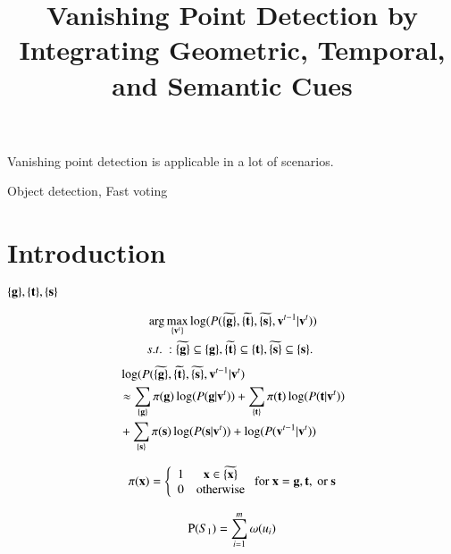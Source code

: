\documentclass[paper]{ieice}
\title{Vanishing Point Detection by Integrating Geometric, Temporal, and Semantic Cues}
\begin{document}
\maketitle
\begin{summary}
Vanishing point detection is applicable in a lot of scenarios.
\end{summary}
\begin{keywords}
Object detection, Fast voting
\end{keywords}

\section{Introduction}


$\{\bf g\},\{\bf t\},\{\bf s\}$

\[
\begin{aligned}
&\arg\max  \limits_{\{{\bf v}^t\}} \log(P(\widetilde{\{\bf g\}},\widetilde{\{\bf t\}},\widetilde{\{\bf s\}},{\bf v}^{t-1}|{\bf v}^t) )\\
&s.t.\ :\widetilde{\{\bf g\}} \subseteq \{\bf g\},\widetilde{\{\bf t\}} \subseteq \{\bf t\}, \widetilde{\{\bf s\}} \subseteq \{\bf s\}.\\
\end{aligned}
\]
\[
\begin{aligned}
&\log(P(\widetilde{\{\bf g\}},\widetilde{\{\bf t\}},\widetilde{\{\bf s\}},{\bf v}^{t-1}|{\bf v}^t)\\ 
&\approx \sum_{\{\bf g\}}{\pi({\bf g})\log(P({\bf g}|{\bf v}^t))}+\sum_{\{\bf t\}}{\pi({\bf t})\log(P({\bf t}|{\bf v}^t))}\\&+\sum_{\{\bf s\}}{\pi({\bf s})\log(P({\bf s}|{\bf v}^t))}+\log(P({\bf v}^{t-1}|{\bf v}^t))\\
\end{aligned}
\]




\[
\pi({\bf x})
= \left\{ \begin{array}{*{20}{c}}
   1   &{\bf x} \in \widetilde{\{{\bf x}\}} \\
   0 &\mbox{otherwise}
\end{array} \right. \mbox{for } {\bf x} = {\bf g},{\bf t},\mbox{ or }{\bf s}
\]

\[
{\rm P}(S_1)=\sum_{i=1}^m {\omega({u_i})}
\]





\end{document}
